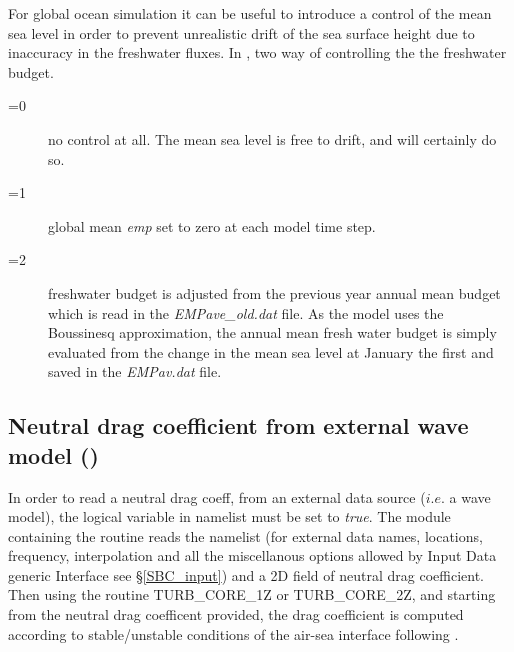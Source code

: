 \documentclass[NEMO_book]{subfiles}
\begin{document}
For global ocean simulation it can be useful to introduce a control of the mean sea 
level in order to prevent unrealistic drift of the sea surface height due to inaccuracy 
in the freshwater fluxes. In \NEMO, two way of controlling the the freshwater budget. 
\begin{description}
\item[=0]  no control at all. The mean sea level is free to drift, and will 
certainly do so.
\item[=1]  global mean \textit{emp} set to zero at each model time step. 
\item[=2]  freshwater budget is adjusted from the previous year annual 
mean budget which is read in the \textit{EMPave\_old.dat} file. As the model uses the 
Boussinesq approximation, the annual mean fresh water budget is simply evaluated 
from the change in the mean sea level at January the first and saved in the 
\textit{EMPav.dat} file. 
\end{description}

\subsection   [Neutral drag coefficient from external wave model (\textit{sbcwave})]
              {Neutral drag coefficient from external wave model ()}
\label{SBC_wave}

In order to read a neutral drag coeff, from an external data source ($i.e.$ a wave model), the 
logical variable  in  namelist must be set to \textit{true}. 
The  module containing the routine  reads the
namelist  (for external data names, locations, frequency, interpolation and all 
the miscellanous options allowed by Input Data generic Interface see \S\ref{SBC_input}) 
and a 2D field of neutral drag coefficient. 
Then using the routine TURB\_CORE\_1Z or TURB\_CORE\_2Z, and starting from the neutral drag coefficent provided, 
the drag coefficient is computed according to stable/unstable conditions of the air-sea interface following \citet{Large_Yeager_Rep04}.
\end{document}
